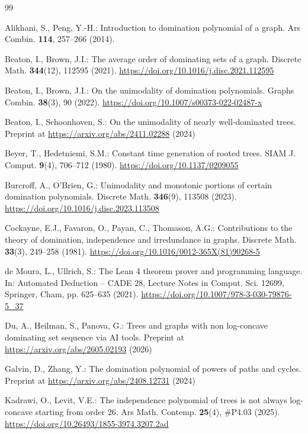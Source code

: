 \begin{thebibliography}{99}

 Alikhani, S., Peng, Y.-H.: Introduction to domination polynomial of a graph. Ars Combin. \textbf{114}, 257--266 (2014).

 Beaton, I., Brown, J.I.: The average order of dominating sets of a graph. Discrete Math. \textbf{344}(12), 112595 (2021). \url{https://doi.org/10.1016/j.disc.2021.112595}

 Beaton, I., Brown, J.I.: On the unimodality of domination polynomials. Graphs Combin. \textbf{38}(3), 90 (2022). \url{https://doi.org/10.1007/s00373-022-02487-x}

 Beaton, I., Schoonhoven, S.: On the unimodality of nearly well-dominated trees. Preprint at \url{https://arxiv.org/abs/2411.02288} (2024)

 Beyer, T., Hedetniemi, S.M.: Constant time generation of rooted trees. SIAM J. Comput. \textbf{9}(4), 706--712 (1980). \url{https://doi.org/10.1137/0209055}

 Burcroff, A., O'Brien, G.: Unimodality and monotonic portions of certain domination polynomials. Discrete Math. \textbf{346}(9), 113508 (2023). \url{https://doi.org/10.1016/j.disc.2023.113508}

 Cockayne, E.J., Favaron, O., Payan, C., Thomason, A.G.: Contributions to the theory of domination, independence and irredundance in graphs. Discrete Math. \textbf{33}(3), 249--258 (1981). \url{https://doi.org/10.1016/0012-365X(81)90268-5}

 de Moura, L., Ullrich, S.: The Lean 4 theorem prover and programming language. In: Automated Deduction -- CADE 28, Lecture Notes in Comput. Sci. 12699, Springer, Cham, pp. 625--635 (2021). \url{https://doi.org/10.1007/978-3-030-79876-5_37}

 Du, A., Heilman, S., Panova, G.: Trees and graphs with non log-concave dominating set sequence via AI tools. Preprint at \url{https://arxiv.org/abs/2605.02193} (2026)

 Galvin, D., Zhang, Y.: The domination polynomial of powers of paths and cycles. Preprint at \url{https://arxiv.org/abs/2408.12731} (2024)

 Kadrawi, O., Levit, V.E.: The independence polynomial of trees is not always log-concave starting from order 26. Ars Math. Contemp. \textbf{25}(4), \#P4.03 (2025). \url{https://doi.org/10.26493/1855-3974.3207.2ad}


\end{thebibliography}
